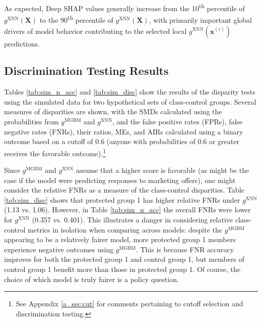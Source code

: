 \documentclass[information,article,submit,moreauthors,pdftex]{definitions/mdpi}
\begin{document}
\noindent As expected, Deep SHAP values generally increase from the 10\textsuperscript{th} percentile of $g^\text{XNN}(\mathbf{X})$ to the 90\textsuperscript{th} percentile of $g^\text{XNN}(\mathbf{X})$, with primarily important global drivers of model behavior contributing to the selected local $g^\text{XNN}(\mathbf{x}^{(i)})$ predictions.

\subsection{Discrimination Testing Results}\label{ssec:dis_sim}

Tables \ref{tab:sim_n_acc} and \ref{tab:sim_disc} show the results of the disparity tests using the simulated data for two hypothetical sets of class-control groups.  Several measures of disparities are shown, with the SMDs calculated using the probabilities from $g^{\text{MGBM}}$ and  $g^{\text{XNN}}$, and the false positive rates (FPRs), false negative rates (FNRs), their ratios, MEs, and AIRs calculated using a binary outcome based on a cutoff of 0.6 (anyone with probabilities of 0.6 or greater receives the favorable outcome).\footnote{See Appendix \ref{a_sec:cut} for comments pertaining to cutoff selection and discrimination testing.}

Since $g^{\text{MGBM}}$ and $g^{\text{XNN}}$ assume that a higher score is favorable (as might be the case if the model were predicting responses to marketing offers), one might consider the relative FNRs as a measure of the class-control disparities. Table \ref{tab:sim_disc} shows that protected group 1 has higher relative FNRs under $g^{\text{XNN}}$ (1.13 vs. 1.06).  However, in Table \ref{tab:sim_n_acc} the overall FNRs were lower for  $g^{\text{XNN}}$ (0.357 vs. 0.401). This illustrates a danger in considering relative class-control metrics in isolation when comparing across models: despite the $g^\text{MGBM}$ appearing to be a relatively fairer model, more protected group 1 members experience negative outcomes using $g^{\text{MGBM}}$. This is because FNR accuracy improves for both the protected group 1 and control group 1, but members of control group 1 benefit more than those in protected group 1.  Of course, the choice of which model is truly fairer is a policy question.
\end{document}
